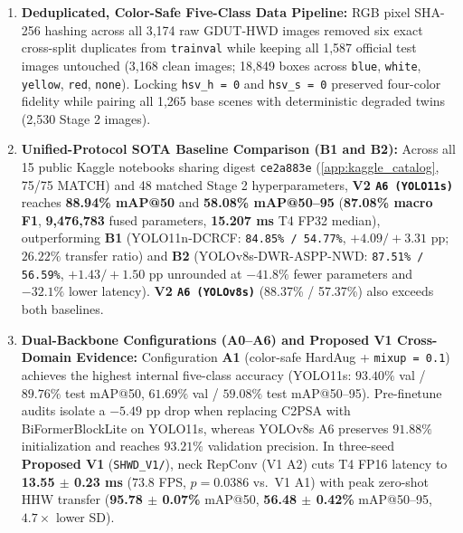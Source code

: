 \begin{enumerate}[leftmargin=1.8em, itemsep=3pt]
  \item \textbf{Deduplicated, Color-Safe Five-Class Data Pipeline:} RGB pixel SHA-256 hashing across all 3,174 raw GDUT-HWD images removed six exact cross-split duplicates from \texttt{trainval} while keeping all 1,587 official test images untouched (3,168 clean images; 18,849 boxes across \texttt{blue}, \texttt{white}, \texttt{yellow}, \texttt{red}, \texttt{none}). Locking \texttt{hsv\_h = 0} and \texttt{hsv\_s = 0} preserved four-color fidelity while pairing all 1,265 base scenes with deterministic degraded twins (2,530 Stage 2 images).
  \item \textbf{Unified-Protocol SOTA Baseline Comparison (B1 and B2):} Across all 15 public Kaggle notebooks sharing digest \texttt{ce2a883e} (\ref{app:kaggle_catalog}, 75/75 MATCH) and 48 matched Stage 2 hyperparameters, \textbf{V2 \texttt{A6 (YOLO11s)}} reaches \textbf{88.94\% mAP@50} and \textbf{58.08\% mAP@50--95} (\textbf{87.08\% macro F1}, \textbf{9,476,783} fused parameters, \textbf{15.207 ms} T4 FP32 median), outperforming \textbf{B1} (YOLO11n-DCRCF: \texttt{84.85\% / 54.77\%}, $+4.09 / +3.31$ pp; $26.22\%$ transfer ratio) and \textbf{B2} (YOLOv8s-DWR-ASPP-NWD: \texttt{87.51\% / 56.59\%}, $+1.43 / +1.50$ pp unrounded at $-41.8\%$ fewer parameters and $-32.1\%$ lower latency). \textbf{V2 \texttt{A6 (YOLOv8s)}} (88.37\% / 57.37\%) also exceeds both baselines.
  \item \textbf{Dual-Backbone Configurations (A0--A6) and Proposed V1 Cross-Domain Evidence:} Configuration \textbf{A1} (color-safe HardAug + \texttt{mixup = 0.1}) achieves the highest internal five-class accuracy (YOLO11s: $93.40\%$ val / $89.76\%$ test mAP@50, $61.69\%$ val / $59.08\%$ test mAP@50--95). Pre-finetune audits isolate a $-5.49$ pp drop when replacing C2PSA with BiFormerBlockLite on YOLO11s, whereas YOLOv8s A6 preserves $91.88\%$ initialization and reaches $93.21\%$ validation precision. In three-seed \textbf{Proposed V1} (\texttt{SHWD\_V1/}), neck RepConv (V1 A2) cuts T4 FP16 latency to \textbf{13.55 $\pm$ 0.23 ms} ($73.8$ FPS, $p = 0.0386$ vs.\ V1 A1) with peak zero-shot HHW transfer (\textbf{95.78 $\pm$ 0.07\%} mAP@50, \textbf{56.48 $\pm$ 0.42\%} mAP@50--95, $4.7\times$ lower SD).

\end{enumerate}
